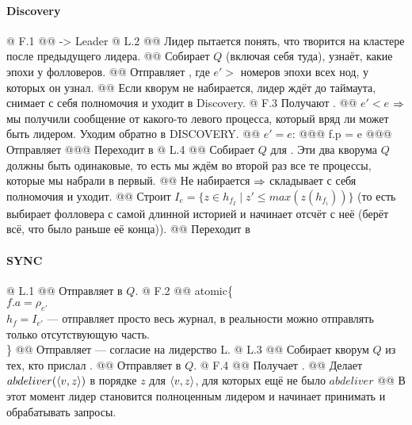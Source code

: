 \paragraph{Discovery}
\begin{el}[ul]
@ F.1 
@@  -> Leader 
@ L.2 
@@ Лидер пытается понять, что творится на кластере после предыдущего лидера.
@@ Собирает $Q$ (включая себя туда), узнаёт, какие эпохи у фолловеров.
@@ Отправляет , где $e' >$ номеров эпохи всех нод, у которых он узнал.
@@ Если кворум не набирается, лидер ждёт до таймаута, снимает с себя полномочия и уходит в Discovery.
@ F.3 Получают .
@@ $e' < e$ $\Rightarrow$ мы получили сообщение от какого-то левого процесса, который вряд ли может быть лидером. Уходим обратно в DISCOVERY.
@@ $e' = e$: 
@@@ f.p = e
@@@ Отправляет 
@@@ Переходит в 
@ L.4 
@@ Собирает $Q$ для . Эти два кворума $Q$ должны быть одинаковые, то есть мы ждём во второй раз все те процессы, которые мы набрали в первый.
@@ Не набирается $\Rightarrow$ складывает с себя полномочия и уходит.
@@ Строит $I_e = \{z \in h_{f_I} \mid z' \le max(z(h_{f_i}))\}$ (то есть выбирает фолловера с самой длинной историей и начинает отсчёт с неё (берёт всё, что было раньше её конца)).
@@ Переходит в 
\end{el}

\paragraph{SYNC}
\begin{el}[ul]
@ L.1 
@@ Отправляет  в $Q$.
@ F.2 
@@ atomic\{\\
$f.a = \rho_{e'}$\\
$h_f = I_{e'}$ --- отправляет просто весь журнал, в реальности можно отправлять только отсутствующую часть.\\
\}
@@ Отправляет  --- согласие на лидерство L.
@ L.3 
@@ Собирает кворум $Q$ из тех, кто прислал .
@@ Отправляет  в $Q$.
@ F.4
@@ Получает .
@@ Делает $abdeliver(\langle v, z\rangle)$ в порядке $z$ для $\langle v, z\rangle$, для которых ещё не было $abdeliver$
@@ В этот момент лидер становится полноценным лидером и начинает принимать и обрабатывать запросы.
\end{el}

